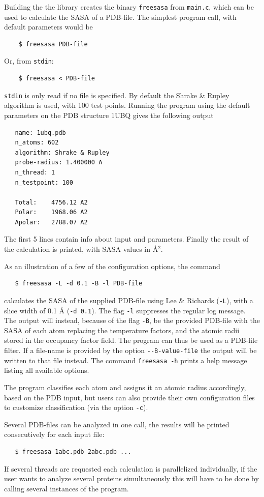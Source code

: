\documentclass[a4paper,11pt]{article}
\begin{document}
Building the the library creates the binary \verb|freesasa| from
\verb|main.c|, which can be used to calculate the SASA of a
PDB-file. The simplest program call, with default parameters would be
\begin{verbatim}
    $ freesasa PDB-file
\end{verbatim}
Or, from \verb|stdin|:
\begin{verbatim} 
    $ freesasa < PDB-file    
\end{verbatim}
\verb|stdin| is only read if no file is specified. By default the
Shrake \& Rupley algorithm is used, with 100 test points. Running the
program using the default parameters on the PDB structure 1UBQ gives
the following output
\begin{verbatim}
   name: 1ubq.pdb
   n_atoms: 602
   algorithm: Shrake & Rupley
   probe-radius: 1.400000 A
   n_thread: 1
   n_testpoint: 100
   
   Total:    4756.12 A2
   Polar:    1968.06 A2
   Apolar:   2788.07 A2
\end{verbatim}
The first 5 lines contain info about input and parameters. Finally the
result of the calculation is printed, with SASA values in Å$^2$.

As an illustration of a few of the configuration options, the command
\begin{verbatim}
   $ freesasa -L -d 0.1 -B -l PDB-file
\end{verbatim}
calculates the SASA of the supplied PDB-file using Lee \& Richards
(\verb|-L|), with a slice width of 0.1 Å (\verb|-d 0.1|). The flag
\verb|-l| suppresses the regular log message. The output will instead,
because of the flag \verb|-B|, be the provided PDB-file with the SASA of each
atom replacing the temperature factors, and the atomic radii stored in
the occupancy factor field. The program can thus be used as a PDB-file
filter. If a file-name is provided by the option \verb|--B-value-file|
the output will be written to that file instead. The command
\verb|freesasa -h| prints a help message listing all available
options.

The program classifies each atom and assigns it an atomic radius
accordingly, based on the PDB input, but users can also provide their
own configuration files to customize classification (via the option
\verb|-c|).

Several PDB-files can be analyzed in one call, the results will be
printed consecutively for each input file:
\begin{verbatim}
   $ freesasa 1abc.pdb 2abc.pdb ...
\end{verbatim}
If several threads are requested each calculation is parallelized
individually, if the user wants to analyze several proteins
simultaneously this will have to be done by calling several instances
of the program.
\end{document}
